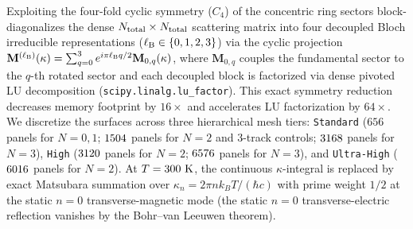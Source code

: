 \documentclass[pdflatex,sn-nature]{sn-jnl}
\begin{document}
Exploiting the four-fold cyclic symmetry ($C_4$) of the concentric ring sectors block-diagonalizes the dense $N_{\rm total} \times N_{\rm total}$ scattering matrix into four decoupled Bloch irreducible representations ($\ell_{\rm B} \in \{0, 1, 2, 3\}$) via the cyclic projection $\mathbf{M}^{(\ell_{\rm B})}(\kappa) = \sum_{q=0}^{3} e^{i\pi \ell_{\rm B} q/2}\mathbf{M}_{0,q}(\kappa)$, where $\mathbf{M}_{0,q}$ couples the fundamental sector to the $q$-th rotated sector and each decoupled block is factorized via dense pivoted LU decomposition (\texttt{scipy.linalg.lu\_factor}). This exact symmetry reduction decreases memory footprint by $16\times$ and accelerates LU factorization by $64\times$. We discretize the surfaces across three hierarchical mesh tiers: \texttt{Standard} ($656$ panels for $N=0,1$; $1504{}$ panels for $N=2$ and 3-track controls; $3168{}$ panels for $N=3$), \texttt{High} ($3120{}$ panels for $N=2$; $6576{}$ panels for $N=3$), and \texttt{Ultra-High} ($6016{}$ panels for $N=2$). At $T = 300{}\text{ K}$, the continuous $\kappa$-integral is replaced by exact Matsubara summation over $\kappa_n = 2\pi n k_B T / (\hbar c)$ with prime weight $1/2$ at the static $n=0$ transverse-magnetic mode (the static $n=0$ transverse-electric reflection vanishes by the Bohr--van Leeuwen theorem).
\end{document}
